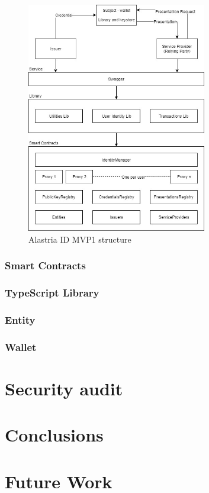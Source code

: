 \documentclass[a4paper, 12pt]{article} %
\begin{document}
        \begin{figure}[h]
            \centering
            \includegraphics[width=0.7\textwidth]{alastria-mvp1.jpg}
            \caption{Alastria ID MVP1 structure}
            \label{fig:ala_structure}
        \end{figure}

        \subsubsection{Smart Contracts}
        
        \subsubsection{TypeScript Library}
        
        \subsubsection{Entity}
        
        \subsubsection{Wallet}

\newpage
\section{Security audit}

\newpage
\section{Conclusions}

\newpage
\section{Future Work}

\newpage
\printbibliography[heading=bibnumbered] %
\end{document}
